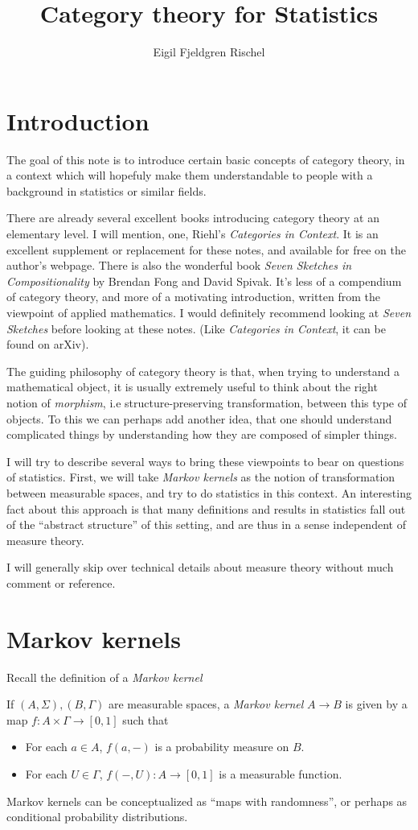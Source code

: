 \documentclass{article}
\title{Category theory for Statistics}
\author{Eigil Fjeldgren Rischel}
\date{}
\begin{document}
\maketitle
\section{Introduction}

The goal of this note is to introduce certain basic concepts of category theory, in a context which will hopefuly make them understandable to people with a background in statistics or similar fields.

There are already several excellent books introducing category theory at an elementary level. I will mention, one, Riehl's \emph{Categories in Context}.
It is an excellent supplement or replacement for these notes, and available for free on the author's webpage.
There is also the wonderful book \emph{Seven Sketches in Compositionality} by Brendan Fong and David Spivak.
It's less of a compendium of category theory, and more of a motivating introduction, written from the viewpoint of applied mathematics.
I would definitely recommend looking at \emph{Seven Sketches} before looking at these notes.
(Like \emph{Categories in Context}, it can be found on arXiv).

The guiding philosophy of category theory is that, when trying to understand a mathematical object, it is usually extremely useful to think about the right notion of \emph{morphism}, i.e structure-preserving transformation, between this type of objects.
To this we can perhaps add another idea, that one should understand complicated things by understanding how they are composed of simpler things.

I will try to describe several ways to bring these viewpoints to bear on questions of statistics. First, we will take \emph{Markov kernels} as the notion of transformation between measurable spaces, and try to do statistics in this context.
An interesting fact about this approach is that many definitions and results in statistics fall out of the ``abstract structure'' of this setting, and are thus in a sense independent of measure theory.

I will generally skip over technical details about measure theory without much comment or reference. 
\section{Markov kernels}
Recall the definition of a \emph{Markov kernel}
\begin{definition}
    If $(A,\Sigma), (B,\Gamma)$ are measurable spaces, a \emph{Markov kernel} $A \to B$ is given by a map $f: A \times \Gamma \to [0,1]$ such that
    \begin{itemize}
        \item For each $a\in A$, $f(a,-)$ is a probability measure on $B$.
        \item For each $U \in \Gamma$, $f(-,U): A \to [0,1]$ is a measurable function.
    \end{itemize}
\end{definition}
Markov kernels can be conceptualized as ``maps with randomness'', or perhaps as conditional probability distributions.
\end{document}
